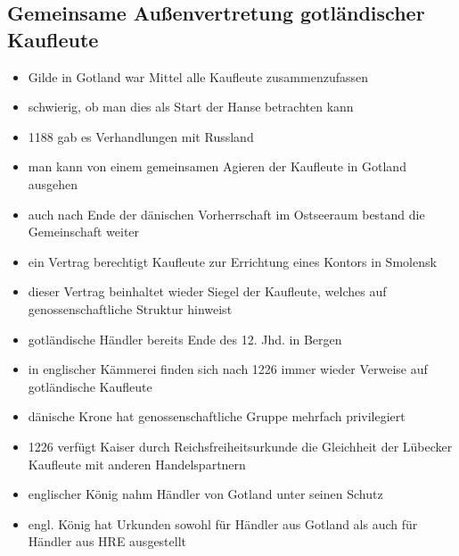 \documentclass[10pt,a4paper,oneside,ngerman,numbers=noenddot]{scrartcl}
\newenvironment{myitemize}{\begin{itemize}\itemsep -8pt}{\end{itemize}} %
\begin{document}
\subsection*{Gemeinsame Außenvertretung gotländischer Kaufleute}
\begin{myitemize}
    \item Gilde in Gotland war Mittel alle Kaufleute zusammenzufassen
    \item schwierig, ob man dies als Start der Hanse betrachten kann
    \item 1188 gab es Verhandlungen mit Russland
    \item man kann von einem gemeinsamen Agieren der Kaufleute in Gotland ausgehen
    \item auch nach Ende der dänischen Vorherrschaft im Ostseeraum bestand die Gemeinschaft weiter
    \item ein Vertrag berechtigt Kaufleute zur Errichtung eines Kontors in Smolensk
    \item dieser Vertrag beinhaltet wieder Siegel der Kaufleute, welches auf genossenschaftliche Struktur
          hinweist
    \item gotländische Händler bereits Ende des 12. Jhd. in Bergen
    \item in englischer Kämmerei finden sich nach 1226 immer wieder Verweise auf gotländische Kaufleute
    \item dänische Krone hat genossenschaftliche Gruppe mehrfach privilegiert
    \item 1226 verfügt Kaiser durch Reichsfreiheitsurkunde die Gleichheit der Lübecker Kaufleute mit anderen
          Handelspartnern
    \item englischer König nahm Händler von Gotland unter seinen Schutz
    \item engl. König hat Urkunden sowohl für Händler aus Gotland als auch für Händler aus HRE ausgestellt
\end{myitemize}
\end{document}
